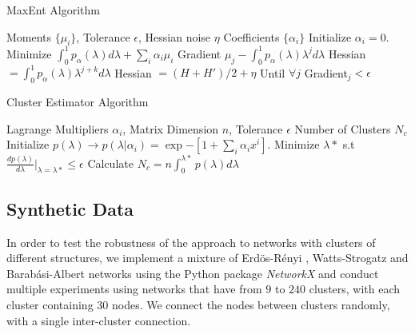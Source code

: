 \documentclass[letterpaper]{article} %
\begin{document}
\begin{algorithm}[tb]
	\caption{MaxEnt Algorithm}
	\label{alg:maxent}
	
	\begin{algorithmic}[1]
		 Moments $\{\mu_{i}\}$, Tolerance $\epsilon$, Hessian noise $\eta$
		 Coefficients $\{\alpha_{i}\}$
		\STATE Initialize $\alpha_{i} = 0$.
		\STATE Minimize $\int_{0}^{1}p_{\alpha}(\lambda)d\lambda + \sum_{i}\alpha_{i}\mu_{i}$
		\STATE Gradient $\mu_{j}-\int_{0}^{1}p_{\alpha}(\lambda)\lambda^{j}d\lambda$
		\STATE Hessian  $ = \int_{0}^{1}p_{\alpha}(\lambda)\lambda^{j+k}d\lambda$
		\STATE Hessian $= (H+H')/2 + \eta$
		\STATE Until $\forall j$ Gradient$_{j} < \epsilon$		
	\end{algorithmic}
\end{algorithm}
\begin{algorithm}[tb]
	\caption{Cluster Estimator Algorithm}
	\label{alg:clusteralg}
	
	\begin{algorithmic}[1]
		 Lagrange Multipliers ${\alpha_{i}}$, Matrix Dimension $n$, Tolerance $\epsilon$
		 Number of Clusters $N_{c}$
		\STATE Initialize $p(\lambda) \rightarrow p(\lambda|\alpha_{i}) = \exp{-[1+\sum_{i}\alpha_{i}x^{i}]}$.
		\STATE Minimize $\lambda*$ s.t $\frac{dp(\lambda)}{d\lambda}|_{\lambda=\lambda*} \leq \epsilon$
		\STATE Calculate $N_{c} = n\int_{0}^{\lambda*} p(\lambda)d\lambda$	
	\end{algorithmic}
\end{algorithm}




\subsection{Synthetic Data}
In order to test the robustness of the approach to networks with clusters of different structures, we implement a mixture of Erd{\"o}s-R{\'e}nyi , Watts-Strogatz and Barabási-Albert networks using the Python package \textit{NetworkX} and conduct multiple experiments using networks that have from $9$ to $240$ clusters, with each cluster containing $30$ nodes. We connect the nodes between clusters randomly, with a single inter-cluster connection. 
\end{document}
